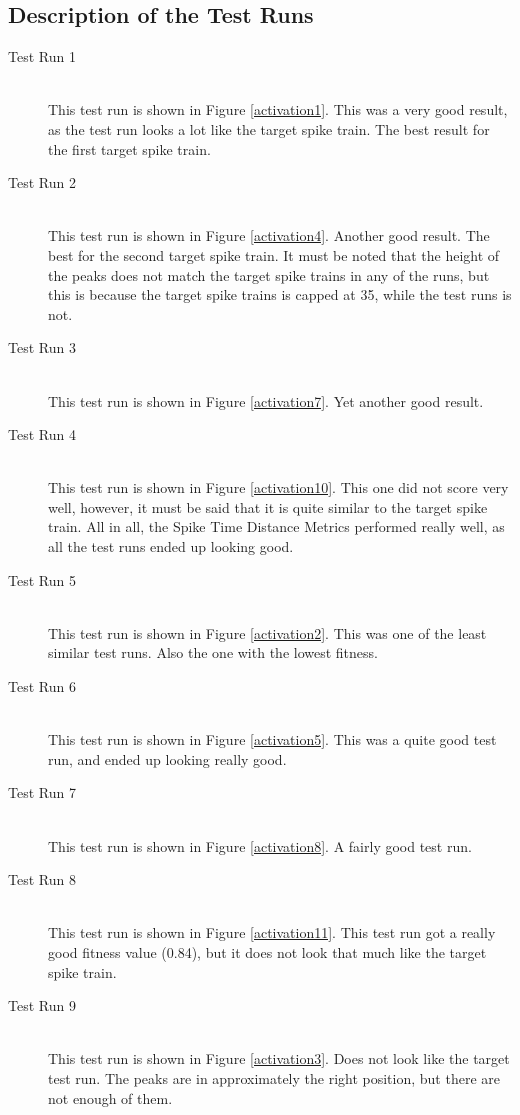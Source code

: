 \documentclass[12pt, a4paper, oneside, titlepage]{article}
\begin{document}
\subsection{Description of the Test Runs}
\begin{description}
\item[Test Run 1] \hfill \\
	This test run is shown in Figure \ref{activation1}. This was a very good result, as the test run looks a lot like the target spike train. The best result for the first target spike train.
\item[Test Run 2] \hfill \\
	This test run is shown in Figure \ref{activation4}. Another good result. The best for the second target spike train. It must be noted that the height of the peaks does not match the target spike trains in any of the runs, but this is because the target spike trains is capped at 35, while the test runs is not.
\item[Test Run 3] \hfill \\
	This test run is shown in Figure \ref{activation7}. Yet another good result.
\item[Test Run 4] \hfill \\
	This test run is shown in Figure \ref{activation10}. This one did not score very well, however, it must be said that it is quite similar to the target spike train. All in all, the Spike Time Distance Metrics performed really well, as all the test runs ended up looking good.
\item[Test Run 5] \hfill \\
	This test run is shown in Figure \ref{activation2}. This was one of the least similar test runs. Also the one with the lowest fitness. 
\item[Test Run 6] \hfill \\
	This test run is shown in Figure \ref{activation5}. This was a quite good test run, and ended up looking really good.
\item[Test Run 7] \hfill \\
	This test run is shown in Figure \ref{activation8}.	A fairly good test run.
\item[Test Run 8] \hfill \\
	This test run is shown in Figure \ref{activation11}. This test run got a really good fitness value (0.84), but it does not look that much like the target spike train.
\item[Test Run 9] \hfill \\
	This test run is shown in Figure \ref{activation3}. Does not look like the target test run. The peaks are in approximately the right position, but there are not enough of them.

\end{description}
\end{document}
